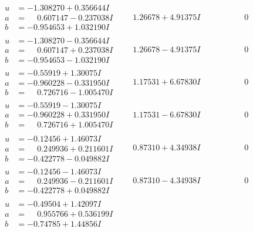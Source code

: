 \documentclass[1p]{elsarticle_modified}
\theoremstyle{definition}
\begin{document}
$$\begin{array}{c|c|c}
\begin{aligned}
u &= -1.308270 + 0.356644 I \\
a &= \phantom{-}0.607147 - 0.237038 I \\
b &= -0.954653 + 1.032190 I\end{aligned}
 & \phantom{-}1.26678 + 4.91375 I & \phantom{-0.000000 } 0 \\ \hline\begin{aligned}
u &= -1.308270 - 0.356644 I \\
a &= \phantom{-}0.607147 + 0.237038 I \\
b &= -0.954653 - 1.032190 I\end{aligned}
 & \phantom{-}1.26678 - 4.91375 I & \phantom{-0.000000 } 0 \\ \hline\begin{aligned}
u &= -0.55919 + 1.30075 I \\
a &= -0.960228 - 0.331950 I \\
b &= \phantom{-}0.726716 - 1.005470 I\end{aligned}
 & \phantom{-}1.17531 + 6.67830 I & \phantom{-0.000000 } 0 \\ \hline\begin{aligned}
u &= -0.55919 - 1.30075 I \\
a &= -0.960228 + 0.331950 I \\
b &= \phantom{-}0.726716 + 1.005470 I\end{aligned}
 & \phantom{-}1.17531 - 6.67830 I & \phantom{-0.000000 } 0 \\ \hline\begin{aligned}
u &= -0.12456 + 1.46073 I \\
a &= \phantom{-}0.249936 + 0.211601 I \\
b &= -0.422778 - 0.049882 I\end{aligned}
 & \phantom{-}0.87310 + 4.34938 I & \phantom{-0.000000 } 0 \\ \hline\begin{aligned}
u &= -0.12456 - 1.46073 I \\
a &= \phantom{-}0.249936 - 0.211601 I \\
b &= -0.422778 + 0.049882 I\end{aligned}
 & \phantom{-}0.87310 - 4.34938 I & \phantom{-0.000000 } 0 \\ \hline\begin{aligned}
u &= -0.49504 + 1.42097 I \\
a &= \phantom{-}0.955766 + 0.536199 I \\
b &= -0.74785 + 1.44856 I\end{aligned}

\end{array}$$
\end{document}

